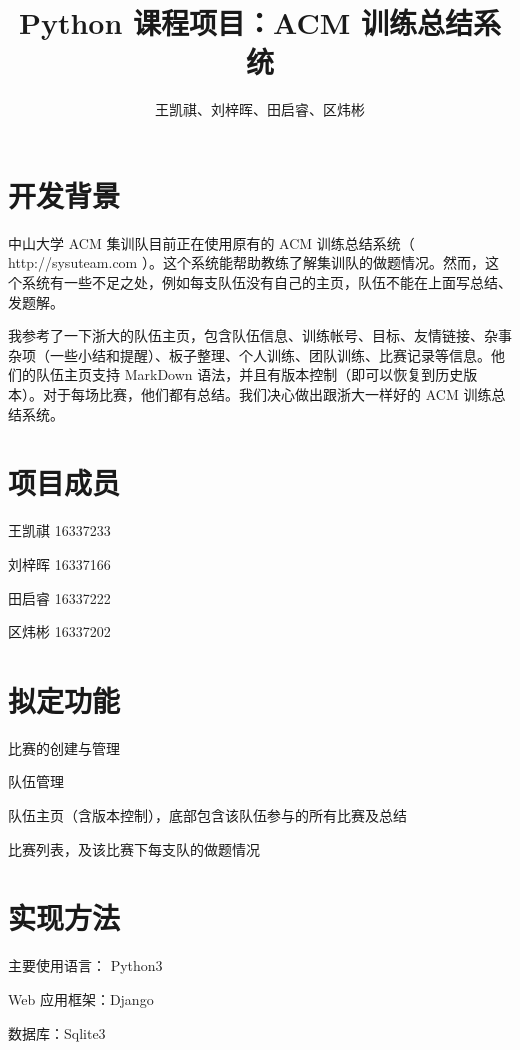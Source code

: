\documentclass{article}
\begin{document}
\title{Python 课程项目：ACM 训练总结系统}
\author{王凯祺、刘梓晖、田启睿、区炜彬}
\maketitle

\section{开发背景}

中山大学 ACM 集训队目前正在使用原有的 ACM 训练总结系统（ http://sysuteam.com ）。这个系统能帮助教练了解集训队的做题情况。然而，这个系统有一些不足之处，例如每支队伍没有自己的主页，队伍不能在上面写总结、发题解。

我参考了一下浙大的队伍主页，包含队伍信息、训练帐号、目标、友情链接、杂事杂项（一些小结和提醒）、板子整理、个人训练、团队训练、比赛记录等信息。他们的队伍主页支持 MarkDown 语法，并且有版本控制（即可以恢复到历史版本）。对于每场比赛，他们都有总结。我们决心做出跟浙大一样好的 ACM 训练总结系统。

\section{项目成员}

王凯祺 16337233

刘梓晖 16337166

田启睿 16337222

区炜彬 16337202

\section{拟定功能}

比赛的创建与管理

队伍管理

队伍主页（含版本控制），底部包含该队伍参与的所有比赛及总结

比赛列表，及该比赛下每支队的做题情况

\section{实现方法}

主要使用语言： Python3

Web 应用框架：Django

数据库：Sqlite3
\end{document}
